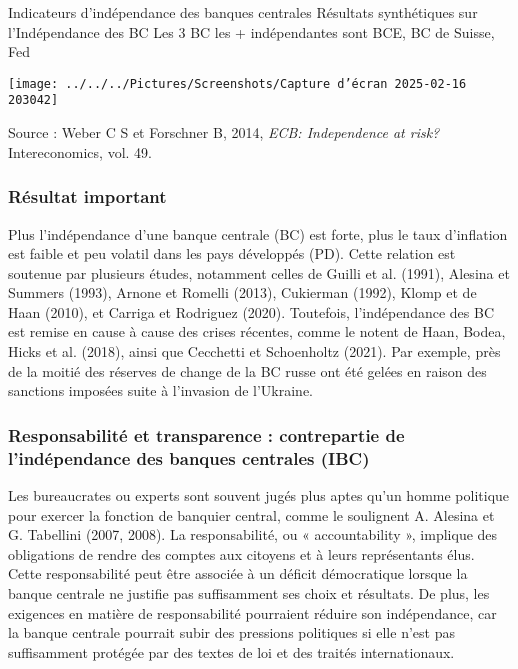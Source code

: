 \documentclass[a4paper, 12pt]{report}
\begin{document}
Indicateurs d'indépendance des banques centrales
Résultats synthétiques sur l'Indépendance des BC
Les 3 BC les + indépendantes sont BCE, BC de Suisse, Fed

\begin{center}
	\texttt{[image: ../../../Pictures/Screenshots/Capture d'écran 2025-02-16 203042]}
\end{center}

Source : Weber C S et Forschner B, 2014, \textit{ECB:
Independence at risk?} Intereconomics, vol. 49.

\subsubsection{Résultat important}

Plus l'indépendance d'une banque centrale (BC) est forte, plus le taux d'inflation est faible et peu volatil dans les pays développés (PD). Cette relation est soutenue par plusieurs études, notamment celles de Guilli et al. (1991), Alesina et Summers (1993), Arnone et Romelli (2013), Cukierman (1992), Klomp et de Haan (2010), et Carriga et Rodriguez (2020). Toutefois, l'indépendance des BC est remise en cause à cause des crises récentes, comme le notent de Haan, Bodea, Hicks et al. (2018), ainsi que Cecchetti et Schoenholtz (2021). Par exemple, près de la moitié des réserves de change de la BC russe ont été gelées en raison des sanctions imposées suite à l'invasion de l'Ukraine.

\subsubsection{Responsabilité et transparence : contrepartie de l'indépendance des banques centrales (IBC)}

 
Les bureaucrates ou experts sont souvent jugés plus aptes qu'un homme politique pour exercer la fonction de banquier central, comme le soulignent A. Alesina et G. Tabellini (2007, 2008). La responsabilité, ou « accountability », implique des obligations de rendre des comptes aux citoyens et à leurs représentants élus. Cette responsabilité peut être associée à un déficit démocratique lorsque la banque centrale ne justifie pas suffisamment ses choix et résultats. De plus, les exigences en matière de responsabilité pourraient réduire son indépendance, car la banque centrale pourrait subir des pressions politiques si elle n'est pas suffisamment protégée par des textes de loi et des traités internationaux.
\end{document}
